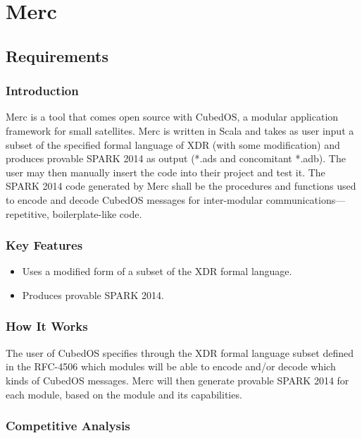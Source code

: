 \chapter{Merc}
\label{chapter-xdr2os3}

\section{Requirements}

\subsection{Introduction}

Merc is a tool that comes open source with CubedOS, a modular application framework for small
satellites. Merc is written in Scala and takes as user input a subset of the specified formal
language of XDR (with some modification) and produces provable SPARK 2014 as output (*.ads and
concomitant *.adb). The user may then manually insert the code into their project and test it.
The SPARK 2014 code generated by Merc shall be the procedures and functions used to encode
and decode CubedOS messages for inter-modular communications—repetitive, boilerplate-like code.

\subsection{Key Features}

\begin{itemize}
\item Uses a modified form of a subset of the XDR formal language.
\item Produces provable SPARK 2014.
\end{itemize}

\subsection{How It Works}

The user of CubedOS specifies through the XDR formal language subset defined in the RFC-4506
which modules will be able to encode and/or decode which kinds of CubedOS messages. Merc will
then generate provable SPARK 2014 for each module, based on the module and its capabilities.

\subsection{Competitive Analysis}

